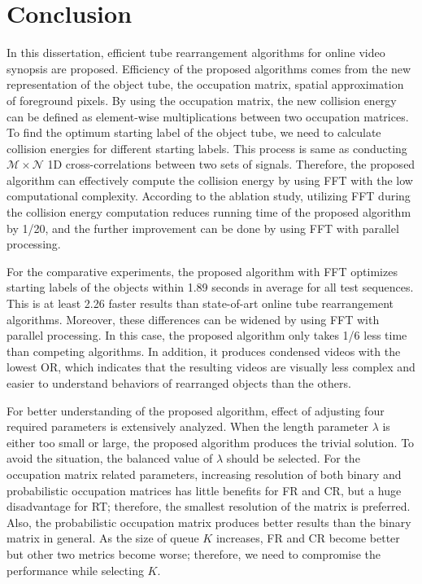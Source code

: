 \documentclass[11pt]{hyu_thesis}
\begin{document}
\chapter{Conclusion}
\label{sec:conc}
In this dissertation, efficient tube rearrangement algorithms for online video synopsis are proposed. Efficiency of the proposed algorithms comes from the new representation of the object tube, the occupation matrix, spatial approximation of foreground pixels. By using the occupation matrix, the new collision energy can be defined as element-wise multiplications between two occupation matrices. To find the optimum starting label of the object tube, we need to calculate collision energies for different starting labels. This process is same as conducting $\mathcal{M}\times\mathcal{N}$ 1D cross-correlations between two sets of signals. Therefore, the proposed algorithm can effectively compute the collision energy by using FFT with the low computational complexity. According to the ablation study, utilizing FFT during the collision energy computation reduces running time of the proposed algorithm by 1/20, and the further improvement can be done by using FFT with parallel processing.

For the comparative experiments, the proposed algorithm with FFT optimizes starting labels of the objects within 1.89 seconds in average for all test sequences. This is at least 2.26 faster results than state-of-art online tube rearrangement algorithms. Moreover, these differences can be widened by using FFT with parallel processing. In this case, the proposed algorithm only takes 1/6 less time than competing algorithms. In addition, it produces condensed videos with the lowest OR, which indicates that the resulting videos are visually less complex and easier to understand behaviors of rearranged objects than the others.

For better understanding of the proposed algorithm, effect of adjusting four required parameters is extensively analyzed. When the length parameter $\lambda$ is either too small or large, the proposed algorithm produces the trivial solution. To avoid the situation, the balanced value of $\lambda$ should be selected. For the occupation matrix related parameters, increasing resolution of both binary and probabilistic occupation matrices has little benefits for FR and CR, but a huge disadvantage for RT; therefore, the smallest resolution of the matrix is preferred. Also, the probabilistic occupation matrix produces better results than the binary matrix in general. As the size of queue $K$ increases, FR and CR become better but other two metrics become worse; therefore, we need to compromise the performance while selecting $K$.
\end{document}
